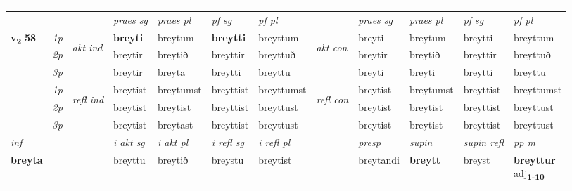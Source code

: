 \begin{longtable}[l]{X>{\footnotesize\itshape}llXXXXlXXXX}
\midrule
& \\
\midrule
 & &   & \textit{praes sg}  & \textit{praes pl}    & \textit{ pf sg} & \textit{pf pl} & & \textit{praes sg}  & \textit{praes pl}    & \textit{pf sg} & \textit{pf pl }  \\ \cmidrule{4-7} \cmidrule{9-12}
 \multirow{2}{*}{{{\textbf{v{\textsubscript{2}}} \Large{\textbf{58}}}}}  & 1p & \multirow{3}{*}{\begin{turn}{90}\textit{akt ind}\end{turn}} & \textbf{breyti} & breytum & \textbf{breytti} & breyttum & \multirow{3}{*}{\begin{turn}{90}\textit{akt con}\end{turn}} &breyti & breytum & breytti & breyttum\\*
 & 2p &  &  breytir  & breytið & breyttir & breyttuð & & breytir & breytið & breyttir & breyttuð \\*
 & 3p &  & breytir & breyta & breytti & breyttu & & breyti & breyti& breytti & breyttu \\*
\cmidrule{4-7} \cmidrule{9-12}
 & 1p & \multirow{3}{*}{\begin{turn}{90}\textit{refl ind}\end{turn}}  & breytist & breytumst & breyttist & breyttumst & \multirow{3}{*}{\begin{turn}{90}\textit{refl con}\end{turn}}  &breytist & breytumst & breyttist & breyttumst \\*
 & 2p &  & breytist & breytist & breyttist & breyttust & &breytist & breytist & breyttist & breyttust \\*
 & 3p  & & breytist & breytast & breyttist & breyttust & & breytist & breytist& breyttist & breyttust \\*
\cmidrule{4-7} \cmidrule{9-12}

   {\textit{inf}} & &  & \textit{i akt sg} & \textit{i akt pl} & \textit{i refl sg} & \textit{i refl pl} && \textit{presp} & \textit{supin} & \textit{supin refl} & \textit{pp m} \\*
  {\textbf{breyta}} & && breyttu  & breytið & breystu & breytist && breytandi &  \textbf{breytt} & breyst & \specialcell{\textbf{breyttur} \\ adj\textbf{\textsubscript{1-10}}} \\*

\midrule


\end{longtable}
